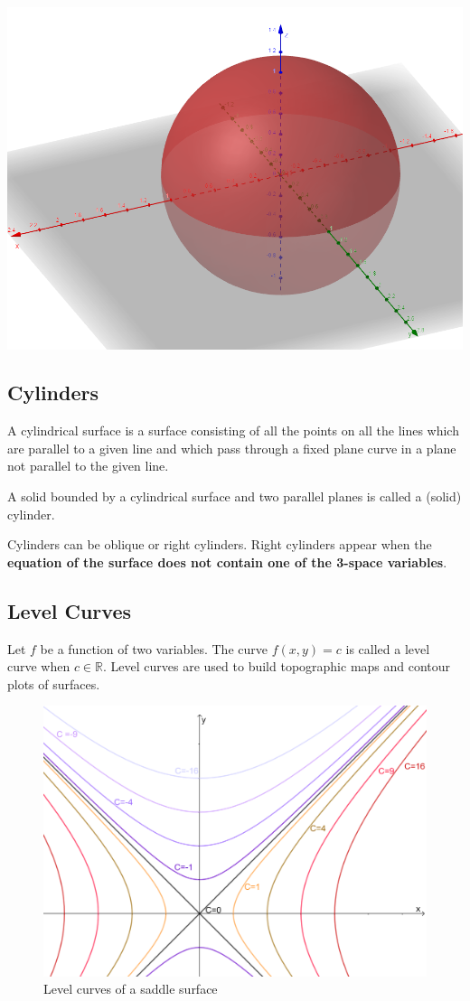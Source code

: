 \documentclass[12pt]{article}
\begin{document}
\begin{enumerate}
\includegraphics[scale=0.5]{sphere.png}

\end{enumerate}
\subsection{Cylinders}
A cylindrical surface is a surface consisting of all the points on all the lines which are parallel to a given line and which pass through a fixed plane curve in a plane not parallel to the given line.

A solid bounded by a cylindrical surface and two parallel planes is called a (solid) cylinder.

Cylinders can be oblique or right cylinders. Right cylinders appear when the \textbf{equation of the surface does not contain one of the 3-space variables}.
\newpage
\subsection{Level Curves}
Let $f$ be a function of two variables. The curve $f(x,y)=c$ is called a level curve when $c\in\mathbb{R}$. Level curves are used to build topographic maps and contour plots of surfaces. 

\begin{figure}[H]
\centering
\includegraphics[scale=0.3]{levelcurve.png}
\caption{Level curves of a saddle surface}
\end{figure}
\end{document}
